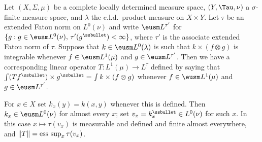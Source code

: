  Let $(X,\Sigma,\mu)$ be a complete locally
determined measure space, $(Y,\Tau,\nu)$ a $\sigma$-finite measure
space, and $\lambda$ the c.l.d.\ product measure on $X\times Y$.   Let
$\tau$ be an extended Fatou norm on $L^0(\nu)$ and write
$\eusm L^{\tau'}$ for
$\{g:g\in\eusm L^0(\nu),\,\tau'(g^{\ssbullet})<\infty\}$,
where $\tau'$ is the associate extended Fatou norm of
$\tau$.   Suppose that $k\in\eusm L^0(\lambda)$ is
such that $k\times(f\otimes g)$ is integrable whenever
$f\in\eusm L^1(\mu)$ and $g\in\eusm L^{\tau'}$.
Then we have a corresponding linear operator $T:L^1(\mu)\to L^{\tau}$
defined by saying that
$\int(Tf^{\ssbullet})\times g^{\ssbullet}=\int k\times(f\otimes g)$
whenever $f\in\eusm L^1(\mu)$ and $g\in\eusm L^{\tau'}$.

For $x\in X$ set $k_x(y)=k(x,y)$ whenever this is defined.    Then
$k_x\in\eusm L^0(\nu)$ for almost every $x$;  set
$v_x=k_x^{\ssbullet}\in L^0(\nu)$ for such $x$.   In this case
$x\mapsto\tau(v_x)$ is measurable and defined and finite almost
everywhere, and $\|T\|=\mathop{\text{ess sup}}_x\tau(v_x)$.


